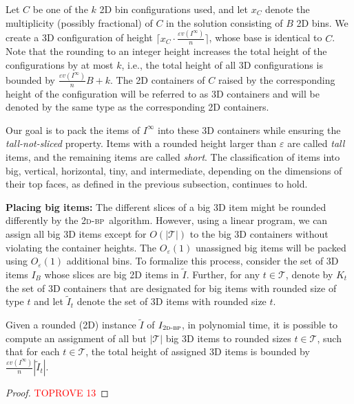 \documentclass[a4paper,UKenglish,cleveref, autoref, thm-restate]{lipics-v2021}
\newcommand{\eps}{\varepsilon}
\newcommand{\twobp}{\textsc{2d-bp}\xspace}
\newcommand{\bigy}{big\xspace}
\begin{document}
Let $C$ be one of the $k$ 2D bin configurations used, and let $x_C$ denote the multiplicity (possibly fractional) of $C$ in the solution consisting of $B$ 2D bins.
We create a 3D configuration of height $\lceil x_C \cdot \frac{\eps v(I^{\infty})}{n}\rceil$, whose base is identical to $C$. 
Note that the rounding to an integer height increases the total height of the configurations by at most $k$, i.e., the total height of all 3D configurations is bounded by $\frac{\eps v(I^{\infty})}{n}B+k$.
The 2D containers of $C$ raised by the corresponding height of the configuration will be referred to as 3D containers and will be denoted by the same type as the corresponding 2D containers.

Our goal is to pack the items of $I^{\infty}$ into these 3D containers while ensuring the \emph{tall-not-sliced} property. Items with a rounded height larger than $\eps$ are called \emph{tall} items, and the remaining items are called \emph{short}. The classification of items into big, vertical, horizontal, tiny, and intermediate, depending on the dimensions of their top faces, as defined in the previous subsection, continues to hold.

{\bf Placing big items:} 
The different slices of a \bigy 3D item might be rounded differently by the \twobp~algorithm. 
However, using a linear program, we can assign all big 3D items except for $O(|\mathcal{T}|)$ to the big 3D containers without violating the container heights.
The $O_{\eps}(1)$ unassigned big items will be packed using $O_{\eps}(1)$ additional bins. 
To formalize this process,
consider the set of 3D items $I_B$ whose slices are \bigy 2D items in $\tilde{I}$.
Further, for any $t \in \mathcal{T}$, denote by $K_t$ the set of 3D containers that are designated for \bigy items with rounded size of type $t$ and let $\tilde{I}_t$ denote the set of 3D items with rounded size $t$.


\begin{lemma}
\label{lem:frist-setp-big-items}
Given a rounded (2D) instance $\tilde{I}$ of $I_{\twobp}$,
in polynomial time, it is possible to compute an assignment of all but $|\mathcal{T}|$ \bigy 3D items to rounded sizes $t \in \mathcal{T}$, such that for each $t \in \mathcal{T}$, the total height of assigned 3D items is bounded by $\frac{\eps v(I^{\infty})}{n} |\tilde{I}_t|$.
\end{lemma}

\begin{proof}\textcolor{red}{TOPROVE 13}\end{proof}
\end{document}
